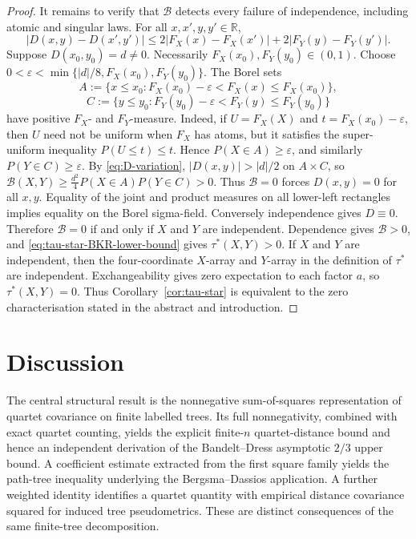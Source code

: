 \documentclass[pdflatex,sn-mathphys-num]{sn-jnl}
\theoremstyle{thmstyleone}
\begin{document}
\begin{proof}
It remains to verify that $\mathcal B$ detects every failure of
independence, including atomic and singular laws.  For all
$x,x',y,y'\in\mathbb R$,
\begin{equation}\label{eq:D-variation}
|D(x,y)-D(x',y')|
\le2|F_X(x)-F_X(x')|+2|F_Y(y)-F_Y(y')|.
\end{equation}
Suppose $D(x_0,y_0)=d\ne0$.  Necessarily
$F_X(x_0),F_Y(y_0)\in(0,1)$.  Choose
$0<\varepsilon<\min\{|d|/8,\allowbreak F_X(x_0),\allowbreak F_Y(y_0)\}$.
The Borel sets
\[
A:=\{x\le x_0:F_X(x_0)-\varepsilon<F_X(x)\le F_X(x_0)\},
\]
\[
C:=\{y\le y_0:F_Y(y_0)-\varepsilon<F_Y(y)\le F_Y(y_0)\}
\]
have positive $F_X$- and $F_Y$-measure.  Indeed, if
$U=F_X(X)$ and $t=F_X(x_0)-\varepsilon$, then $U$ need not be uniform when
$F_X$ has atoms, but it satisfies the super-uniform inequality
$P(U\le t)\le t$.  Hence
$P(X\in A)\ge\varepsilon$, and similarly $P(Y\in C)\ge\varepsilon$.
By \eqref{eq:D-variation}, $|D(x,y)|>|d|/2$ on $A\times C$, so
$\mathcal B(X,Y)\ge\frac{d^2}{4}P(X\in A)P(Y\in C)>0$.
Thus $\mathcal B=0$ forces $D(x,y)=0$ for all $x,y$.  Equality of the
joint and product measures on all lower-left rectangles implies equality
on the Borel sigma-field.  Conversely independence gives $D\equiv0$.
Therefore $\mathcal B=0$ if and only if $X$ and $Y$ are independent.
Dependence gives $\mathcal B>0$, and
\eqref{eq:tau-star-BKR-lower-bound} gives $\tau^*(X,Y)>0$.
If $X$ and $Y$ are independent, then the four-coordinate
$X$-array and $Y$-array in the definition of $\tau^*$ are independent.
Exchangeability gives zero expectation to each factor $a$, so
$\tau^*(X,Y)=0$.  Thus Corollary~\ref{cor:tau-star} is equivalent to the
zero characterisation stated in the abstract and introduction.
\end{proof}

\section{Discussion}

The central structural result is the nonnegative sum-of-squares
representation of quartet covariance on finite labelled trees.  Its full
nonnegativity, combined with exact quartet counting, yields the explicit
finite-$n$ quartet-distance bound and hence an independent derivation of the
Bandelt--Dress asymptotic $2/3$ upper bound.  A coefficient estimate extracted
from the first square family yields the path-tree inequality underlying the
Bergsma--Dassios application.  A further weighted identity identifies a
quartet quantity with empirical distance covariance squared for induced tree
pseudometrics.  These are distinct consequences of the same finite-tree
decomposition.
\end{document}
